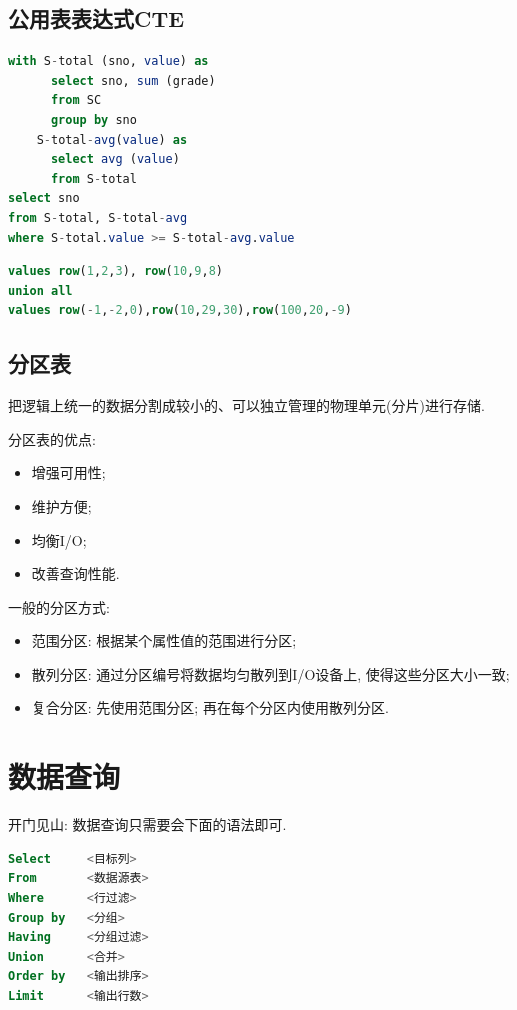 \subsection{公用表表达式CTE}

\begin{lstlisting}[language=SQL]
with S-total (sno, value) as
      select sno, sum (grade)
      from SC
      group by sno
    S-total-avg(value) as
      select avg (value)
      from S-total
select sno
from S-total, S-total-avg
where S-total.value >= S-total-avg.value
\end{lstlisting}

\begin{lstlisting}[language=SQL]
values row(1,2,3), row(10,9,8)
union all
values row(-1,-2,0),row(10,29,30),row(100,20,-9)
\end{lstlisting}

\subsection{分区表}

\begin{definition}[分区表]
  把逻辑上统一的数据分割成较小的、可以独立管理的物理单元(分片)进行存储.
\end{definition}

分区表的优点:
\begin{itemize}
  \item 增强可用性;
  \item 维护方便;
  \item 均衡I/O;
  \item 改善查询性能.
\end{itemize}

一般的分区方式:
\begin{itemize}
  \item 范围分区: 根据某个属性值的范围进行分区;
  \item 散列分区: 通过分区编号将数据均匀散列到I/O设备上, 使得这些分区大小一致;
  \item 复合分区: 先使用范围分区; 再在每个分区内使用散列分区.
\end{itemize}

\section{数据查询}

开门见山: 数据查询只需要会下面的语法即可.
\begin{lstlisting}[language=SQL]
Select     <目标列>
From       <数据源表>
Where      <行过滤>
Group by   <分组>
Having     <分组过滤>
Union      <合并>
Order by   <输出排序>
Limit      <输出行数>
\end{lstlisting}

